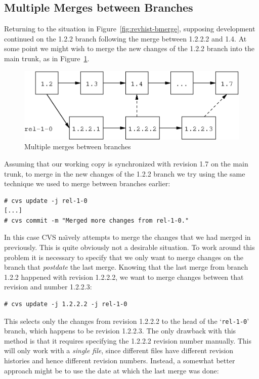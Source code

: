 \documentclass[12pt,letterpaper]{article}
\newcommand{\cmd}[1]{`\texttt{#1}'}
\begin{document}
\subsection{Multiple Merges between Branches}

Returning to the situation in Figure~\ref{fig:revhist-bmerge}, supposing
development continued on the 1.2.2 branch following the merge between 1.2.2.2
and 1.4.  At some point we might wish to merge the new changes of the 1.2.2
branch into the main trunk, as in Figure~\ref{fig:revhist-mulbmerge}.

\begin{figure}[htb]
\begin{center}
\includegraphics[width=\textwidth-1in]{revhist-mulbmerge.eps}
\end{center}
\caption{Multiple merges between branches}
\label{fig:revhist-mulbmerge}
\end{figure}

Assuming that our working copy is synchronized with revision 1.7 on the main
trunk, to merge in the new changes of the 1.2.2 branch we try using the same
technique we used to merge between branches earlier:

\begin{Verbatim}
# cvs update -j rel-1-0
[...]
# cvs commit -m "Merged more changes from rel-1-0."
\end{Verbatim}

In this case CVS na\"\i{}vely attempts to merge the changes that we had merged
in previously.  This is quite obviously not a desirable situation.  To work
around this problem it is necessary to specify that we only want to merge
changes on the branch that \emph{postdate} the last merge.  Knowing that the
last merge from branch 1.2.2 happened with revision 1.2.2.2, we want to merge
changes between that revision and number 1.2.2.3:

\begin{Verbatim}
# cvs update -j 1.2.2.2 -j rel-1-0
\end{Verbatim}

This selects only the changes from revision 1.2.2.2 to the head of the
\cmd{rel-1-0} branch, which happens to be revision 1.2.2.3.  The only drawback
with this method is that it requires specifying the 1.2.2.2 revision number
manually.  This will only work with a \emph{single file}, since different
files have different revision histories and hence different revision numbers.
Instead, a somewhat better approach might be to use the date at which the last
merge was done:
\end{document}
